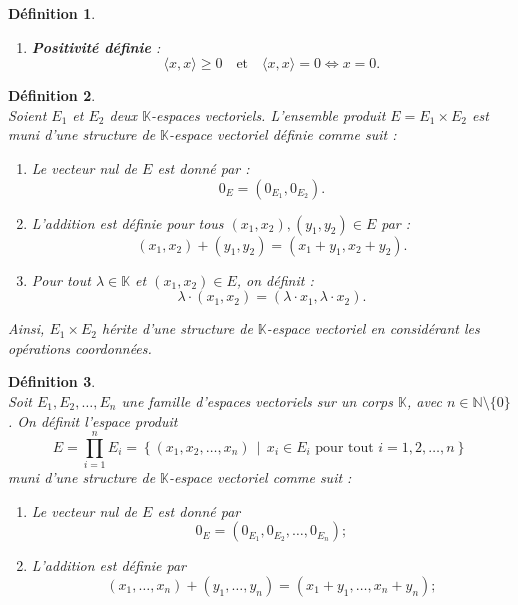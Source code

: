 \documentclass[a4paper, 14pt]{report}
\newtheorem{definition}{Définition}[section]
\begin{document}
\begin{onehalfspace}
{\begin{definition}
\begin{enumerate} [label=\roman*)]
	\item \textbf{Positivité définie} :
	\[
	\langle x, x \rangle \geq 0 \quad \text{et} \quad \langle x, x \rangle = 0 \iff x = 0.
	\]
\end{enumerate}
\end{definition}

\begin{definition} \cite{axler2024linear}\\
Soient \( E_1 \) et \( E_2 \) deux \(\mathbb{K}\)-espaces vectoriels.  L'ensemble produit \( E = E_1 \times E_2 \) est muni d'une structure de \(\mathbb{K}\)-espace vectoriel définie comme suit :  
	\begin{enumerate}[label=\roman*)]
		\item   
		Le vecteur nul de \( E \) est donné par :  
		\[
		0_E = (0_{E_1}, 0_{E_2}).
		\]
		
		\item 
		L'addition est définie pour tous \( (x_1, x_2), (y_1, y_2) \in E \) par :  
		\[
		(x_1, x_2) + (y_1, y_2) = (x_1 + y_1, x_2 + y_2).
		\]
		
		\item   
		Pour tout \( \lambda \in \mathbb{K} \) et \( (x_1, x_2) \in E \), on définit :  
		\[
		\lambda \cdot (x_1, x_2) = (\lambda \cdot x_1, \lambda \cdot x_2).
		\]
	\end{enumerate}
Ainsi, \( E_1 \times E_2 \) hérite d'une structure de \( \mathbb{K} \)-espace vectoriel en considérant les opérations coordonnées.
\end{definition}

\begin{definition} \cite{axler2024linear}\\
Soit \( E_1, E_2, \dots, E_n \) une famille d'espaces vectoriels sur un corps \( \mathbb{K} \), avec \( n \in \mathbb{N} \setminus \{0\} \). On définit l’espace produit
	\[
	E = \prod_{i=1}^{n} E_i = \left\{ (x_1, x_2, \dots, x_n) \,\middle|\, x_i \in E_i \text{ pour tout } i = 1, 2, \dots, n \right\}
	\]
	muni d'une structure de \( \mathbb{K} \)-espace vectoriel comme suit :
	
	\begin{enumerate}[label=\roman*)]
		\item Le vecteur nul de \( E \) est donné par 
		\[
		0_E = (0_{E_1}, 0_{E_2}, \dots, 0_{E_n});
		\]
		
		\item L’addition est définie par 
		\[
		(x_1, \dots, x_n) + (y_1, \dots, y_n) = (x_1 + y_1, \dots, x_n + y_n);
		\]
		

\end{enumerate}
\end{definition}}
\end{onehalfspace}
\end{document}
